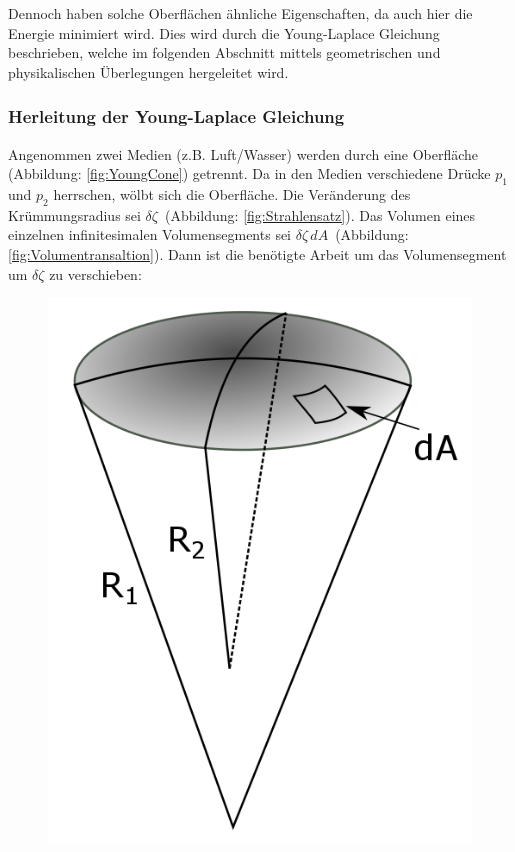 \begin{refsection}
Dennoch haben solche Oberflächen ähnliche Eigenschaften, da auch hier die Energie minimiert wird. Dies wird durch die Young-Laplace Gleichung \cite{minimal:Laplace} beschrieben, welche im folgenden Abschnitt mittels geometrischen und physikalischen Überlegungen hergeleitet wird.

\subsubsection{Herleitung der Young-Laplace Gleichung}\label{YL-Herleitung}
Angenommen zwei Medien (z.B. Luft/Wasser) werden durch eine Oberfläche \, (Abbildung: \ref{fig:YoungCone}) getrennt. Da in den Medien verschiedene Drücke $p_1$ und $p_2$ herrschen, wölbt sich die Oberfläche. Die Veränderung des Krümmungsradius sei $\delta\zeta$ \,(Abbildung: \ref{fig:Strahlensatz}). Das Volumen eines einzelnen infinitesimalen Volumensegments sei $\delta\zeta\,dA$ \,(Abbildung: \ref{fig:Volumentransaltion}). Dann ist die benötigte Arbeit um das Volumensegment um $\delta\zeta$ zu verschieben:
\begin{figure}
  \centering
  \includegraphics[scale=0.3]{minimal/YoungCone.png}

\end{figure}
\end{refsection}
